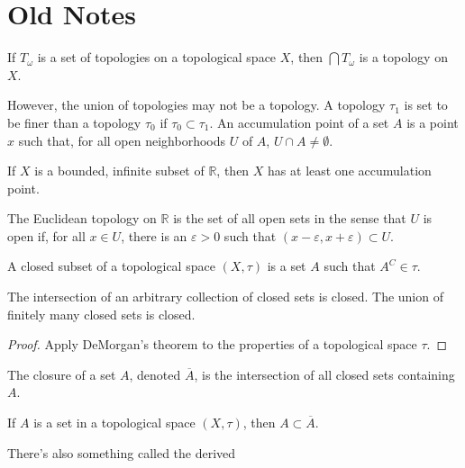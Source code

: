 \section{Old Notes}
    \begin{theorem}
        If $T_{\omega}$ is a set of topologies on
        a topological space $X$, then
        $\bigcap{T_{\omega}}$ is a topology on $X$.
    \end{theorem}
    However, the union of topologies may not be a
    topology. A topology $\tau_{1}$ is set to
    be finer than a topology $\tau_{0}$ if
    $\tau_{0}\subset\tau_{1}$. An accumulation point
    of a set $A$ is a point $x$ such that, for
    all open neighborhoods $U$ of $A$,
    $U\cap{A}\ne\emptyset$.
    \begin{theorem}
        If $X$ is a bounded, infinite subset of
        $\mathbb{R}$, then $X$ has at least
        one accumulation point.
    \end{theorem}
    \begin{definition}
        The Euclidean topology on
        $\mathbb{R}$ is the set of
        all open sets in the sense that
        $U$ is open if, for all $x\in{U}$,
        there is an $\varepsilon>0$ such
        that $(x-\varepsilon,x+\varepsilon)\subset{U}$.
    \end{definition}
    \begin{definition}
        A closed subset of a topological space
        $(X,\tau)$ is a set $A$ such that
        $A^{C}\in\tau$.
    \end{definition}
    \begin{theorem}
        The intersection of an arbitrary collection of
        closed sets is closed. The union of finitely
        many closed sets is closed.
    \end{theorem}
    \begin{proof}
        Apply DeMorgan's theorem to the properties
        of a topological space $\tau$.
    \end{proof}
    \begin{definition}
        The closure of a set $A$,
        denoted $\overline{A}$, is the
        intersection of all closed sets
        containing $A$.
    \end{definition}
    \begin{theorem}
        If $A$ is a set in a topological space
        $(X,\tau)$, then $A\subset\overline{A}$.
    \end{theorem}
    There's also something called the derived
